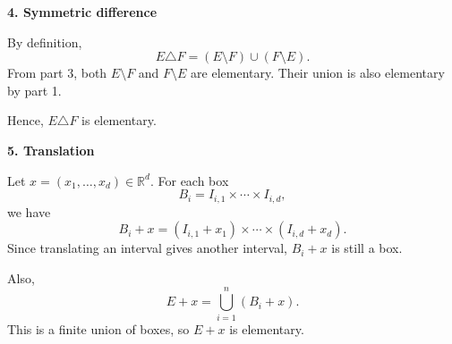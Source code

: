 \begin{exercise}
\noindent\textbf{4. Symmetric difference}

By definition,
\[
E\triangle F=(E\setminus F)\cup(F\setminus E).
\]
From part 3, both $E\setminus F$ and $F\setminus E$
are elementary. Their union is also elementary by part 1.

Hence, $E\triangle F$ is elementary.


\noindent\textbf{5. Translation}

Let $x=(x_1,\ldots,x_d)\in\mathbb{R}^d$.
For each box
\[
B_i=I_{i,1}\times\cdots\times I_{i,d},
\]
we have
\[
B_i+x
=(I_{i,1}+x_1)\times\cdots\times(I_{i,d}+x_d).
\]
Since translating an interval gives another interval,
$B_i+x$ is still a box.

Also,
\[
E+x=\bigcup_{i=1}^{n}(B_i+x).
\]
This is a finite union of boxes, so $E+x$ is elementary.
\end{exercise}